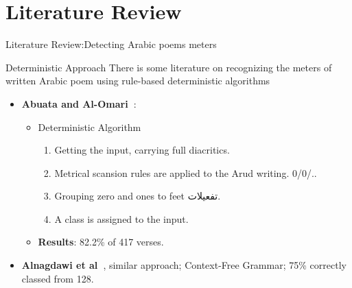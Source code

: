\section{Literature Review}

\begin{frame}[fragile]{Literature Review:Detecting Arabic poems meters}

\begin{block}{Deterministic Approach}
	There is some literature on recognizing the meters of written Arabic poem using rule-based deterministic algorithms
\end{block}

\begin{itemize}
	\item <1-> [--] \textbf{Abuata and Al-Omari~\cite{Abuata2016RuleBasedAlgorithm}}:
	\begin{itemize}
		\item<2-> Deterministic Algorithm
		\begin{enumerate}
			\item Getting the input, carrying full diacritics.
			\item Metrical scansion rules are applied to the Arud writing. 0/0/..
			\item Grouping zero and ones to feet \textarabic{تفعيلات}.
			\item A class is assigned  to the input.
		\end{enumerate}
		\item<3-> \textbf{\alert{Results}}: 82.2\% of 417 verses.
	\end{itemize}
	\item <4->[--]\textbf{Alnagdawi et al~\cite{Alnagdawi2013FindingArabicPoemMeter}}, similar approach;  Context-Free Grammar; 75\% correctly
	classed from 128.
\end{itemize}


\end{frame}

